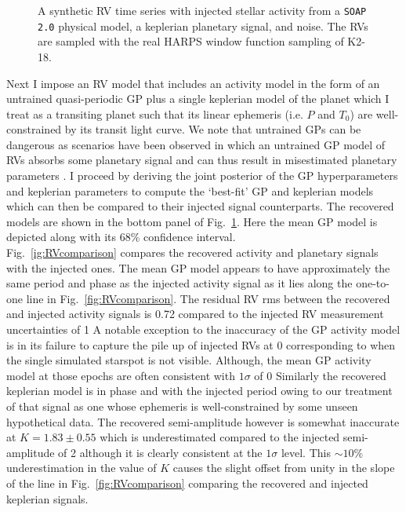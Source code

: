 \begin{figure}
  \centering
  \caption[Synthetic RV time series used to demonstrate the effectiveness of GP activity modelling.]
          {A synthetic RV time series with injected stellar activity from a \texttt{SOAP 2.0} physical
            model, a keplerian planetary signal, and noise. The RVs are sampled with the real HARPS window
            function sampling of K2-18.}
  \label{fig:RVsignals}
\end{figure}

Next I impose an RV model that includes an activity model in the form of an untrained
quasi-periodic GP plus a single keplerian model of the planet which I treat as a transiting
planet such that its linear ephemeris (i.e. $P$ and $T_0$) are well-constrained by its transit
light curve. We note that untrained GPs can be dangerous as scenarios have been observed in which
an untrained GP model of RVs absorbs some planetary signal and can thus result in misestimated
planetary parameters \citep{ribas18}.
I proceed by deriving the joint posterior of the GP hyperparameters and keplerian
parameters to compute the `best-fit' GP and keplerian models which can then be compared to their
injected signal counterparts. The recovered models are shown in the bottom panel of
Fig.~\ref{fig:RVsignals}. Here the mean GP model is depicted along with its 68\% confidence
interval. \\

Fig.~\ref{ig:RVcomparison} compares the recovered activity and planetary signals with the injected
ones. The mean GP model appears to have approximately the same period and phase as the injected activity
signal as it lies along the one-to-one line in Fig.~\ref{fig:RVcomparison}. The residual RV rms between the
recovered and injected activity signals is 0.72 \mps{} compared to the injected RV measurement uncertainties
of 1  A notable exception to the inaccuracy of the GP activity model is in its failure to
capture the pile up of injected RVs at 0 \mps{} corresponding to when the single simulated starspot is
not visible. Although, the mean GP activity model at those epochs are often consistent with $1\sigma$ of
0  Similarly the recovered keplerian model is in phase and with the injected period owing to our
treatment of that signal as one whose ephemeris is well-constrained by some unseen hypothetical data.
The recovered semi-amplitude however is somewhat inaccurate at $K=1.83 \pm 0.55$ \mps{} which is underestimated
compared to the injected semi-amplitude of 2 \mps{} although it is clearly consistent at the $1\sigma$ level.
This $\sim 10$\% underestimation in the value of $K$ causes the slight offset from unity in the slope
of the line in Fig.~\ref{fig:RVcomparison} comparing the recovered and injected keplerian signals.

